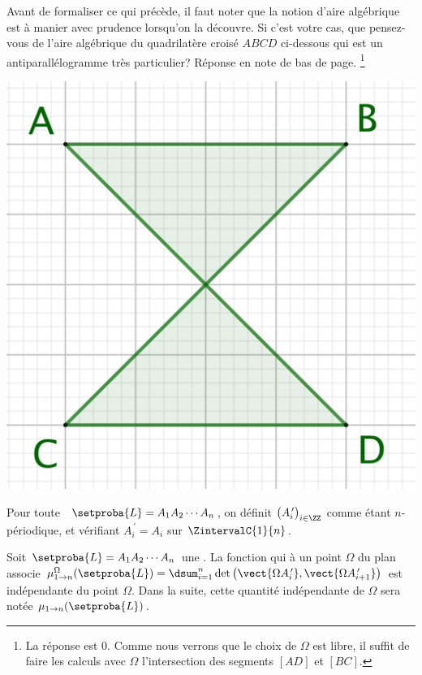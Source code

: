 Avant de formaliser ce qui précède, il faut noter que la notion d'aire algébrique est à manier avec prudence lorsqu'on la découvre. 
Si c'est votre cas, que pensez-vous de l'aire algébrique du quadrilatère croisé $ABCD$ ci-dessous qui est un antiparallélogramme très particulier? Réponse en note de bas de page.%
\footnote{
    La réponse est $0$. Comme nous verrons que le choix de $\Omega$ est libre, il suffit de faire les calculs avec $\Omega$ l'intersection des segments $[AD]$ et $[BC]$.
}

\begin{center}
    \includegraphics[scale=.4]{content/polygon/sufficient-cond/anti-para.png}
\end{center}




\begin{defi} \label{garea-pt-ct}
    Pour toute \nline\  $\setproba{L} = A_1 A_2 \cdots A_n$, on définit $\big( A^{\,\prime}_i \big)_{i \in \ZZ}$ comme étant $n$-périodique, et vérifiant $A^{\,\prime}_{i} = A_i$ sur $\ZintervalC{1}{n}$.
\end{defi}




\begin{fact} \label{garea-pt-ct}
    Soit $\setproba{L} = A_1 A_2 \cdots A_n$ une \nline.
    La fonction qui à un point $\Omega$ du plan associe 
    $\mu_{1 \to n}^\Omega (\setproba{L}) = \dsum_{i=1}^{n} \det \big( \vect{\Omega A^{\,\prime}_i} , \vect{\Omega A^{\,\prime}_{i+1}} \big)$ est indépendante du point $\Omega$.
    Dans la suite, cette quantité indépendante de $\Omega$ sera notée $\mu_{1 \to n} (\setproba{L})$.
\end{fact}


